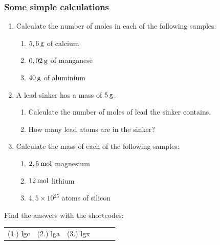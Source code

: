             \subsubsection{  Some simple calculations
      }
            \nopagebreak
      \label{m38717*id278090}\begin{enumerate}[noitemsep, label=\textbf{\arabic*}. ] 
            \label{m38717*uid24}\item Calculate the number of moles in each of the following samples:
\label{m38717*id278106}\begin{enumerate}[noitemsep, label=\textbf{\alph*}. ] 
            \label{m38717*uid25}\item $5,6\phantom{\rule{2pt}{0ex}}\mathrm{g}$ of calcium
\label{m38717*uid26}\item $0,02\phantom{\rule{2pt}{0ex}}\mathrm{g}$ of manganese
\label{m38717*uid27}\item $40\phantom{\rule{2pt}{0ex}}\mathrm{g}$ of aluminium
\end{enumerate}
                \label{m38717*uid28}\item A lead sinker has a mass of $5\phantom{\rule{2pt}{0ex}}\mathrm{g}$.
\label{m38717*id278159}\begin{enumerate}[noitemsep, label=\textbf{\alph*}. ] 
            \label{m38717*uid29}\item Calculate the number of moles of lead the sinker contains.
\label{m38717*uid30}\item How many lead atoms are in the sinker?
\end{enumerate}
                \label{m38717*uid31}\item Calculate the mass of each of the following samples:
\label{m38717*id278201}\begin{enumerate}[noitemsep, label=\textbf{\alph*}. ] 
            \label{m38717*uid32}\item $2,5\phantom{\rule{2pt}{0ex}}\mathrm{mol}$ magnesium
\label{m38717*uid33}\item $12\phantom{\rule{2pt}{0ex}}\mathrm{mol}$ lithium
\label{m38717*uid34}\item $4,5\ensuremath{\times} 10{}^{25}$ atoms of silicon
\end{enumerate}
                \end{enumerate}
    \label{m38717*cid5}
\par {} Find the answers with the shortcodes:
 \par \begin{tabular}[h]{cccccc}
 (1.) lgc  &  (2.) lga  &  (3.) lgx  & \end{tabular}
